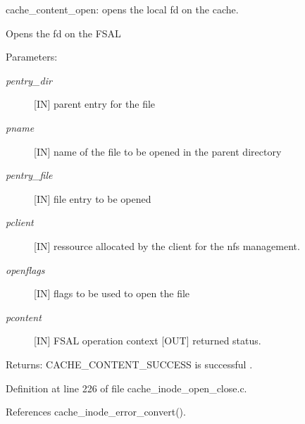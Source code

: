cache\_\-content\_\-open: opens the local fd on the cache.

Opens the fd on the FSAL

\begin{Desc}
\item[Parameters:]
\begin{description}
\item[{\em pentry\_\-dir}][IN] parent entry for the file \item[{\em pname}][IN] name of the file to be opened in the parent directory \item[{\em pentry\_\-file}][IN] file entry to be opened \item[{\em pclient}][IN] ressource allocated by the client for the nfs management. \item[{\em openflags}][IN] flags to be used to open the file \item[{\em pcontent}][IN] FSAL operation context  [OUT] returned status.\end{description}
\end{Desc}
\begin{Desc}
\item[Returns:]CACHE\_\-CONTENT\_\-SUCCESS is successful . \end{Desc}


Definition at line 226 of file cache\_\-inode\_\-open\_\-close.c.

References cache\_\-inode\_\-error\_\-convert().